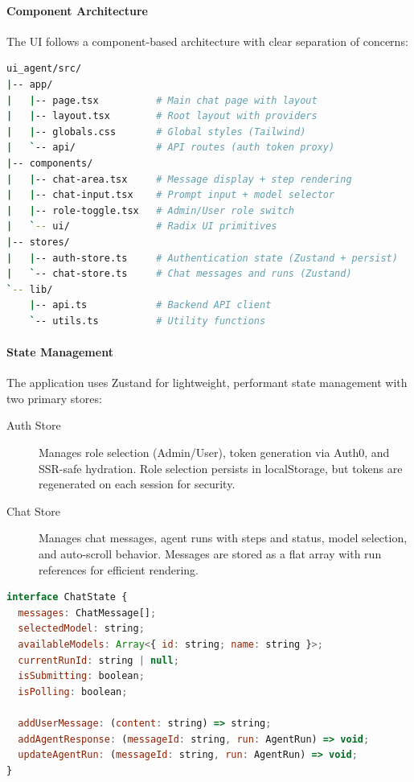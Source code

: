\paragraph{Component Architecture}
The UI follows a component-based architecture with clear separation of concerns:

\begin{lstlisting}[language=bash, caption={Agent Chat UI directory structure.}]
ui_agent/src/
|-- app/
|   |-- page.tsx          # Main chat page with layout
|   |-- layout.tsx        # Root layout with providers
|   |-- globals.css       # Global styles (Tailwind)
|   `-- api/              # API routes (auth token proxy)
|-- components/
|   |-- chat-area.tsx     # Message display + step rendering
|   |-- chat-input.tsx    # Prompt input + model selector
|   |-- role-toggle.tsx   # Admin/User role switch
|   `-- ui/               # Radix UI primitives
|-- stores/
|   |-- auth-store.ts     # Authentication state (Zustand + persist)
|   `-- chat-store.ts     # Chat messages and runs (Zustand)
`-- lib/
    |-- api.ts            # Backend API client
    `-- utils.ts          # Utility functions
\end{lstlisting}

\paragraph{State Management}
The application uses Zustand for lightweight, performant state management with two primary stores:

\begin{description}
    \item[Auth Store] Manages role selection (Admin/User), token generation via Auth0, and SSR-safe hydration. Role selection persists in localStorage, but tokens are regenerated on each session for security.
    
    \item[Chat Store] Manages chat messages, agent runs with steps and status, model selection, and auto-scroll behavior. Messages are stored as a flat array with run references for efficient rendering.
\end{description}

\begin{lstlisting}[language=JavaScript, caption={Zustand store interface pattern.}]
interface ChatState {
  messages: ChatMessage[];
  selectedModel: string;
  availableModels: Array<{ id: string; name: string }>;
  currentRunId: string | null;
  isSubmitting: boolean;
  isPolling: boolean;
  
  addUserMessage: (content: string) => string;
  addAgentResponse: (messageId: string, run: AgentRun) => void;
  updateAgentRun: (messageId: string, run: AgentRun) => void;
}
\end{lstlisting}

